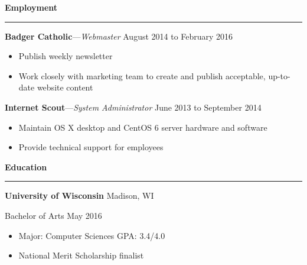\documentclass[12pt,letterpaper]{article}
\newenvironment{details}{
    \vspace{-.8em}
    \begin{itemize}
        \renewcommand \labelitemi{\labelitemiv}
        \setlength{\itemsep}{0pt}
        \setlength{\parskip}{-1pt}
        \setlength{\parsep}{0pt}
    }{
    \end{itemize}
    \vspace{-.5em}
}
\newcommand{\hr} {
    \vspace{-1em}
    \par\rule{\textwidth}{1pt}
    \vspace{-1.5em}
}
\newcommand{\ressection}[1] {
    \par{\large \textbf{#1}}
    \hr
}
\newenvironment{employment} {
    \setlength{\parskip}{0pt}
    \ressection{Employment}
}{
    \vspace{0.5em}
}
\newenvironment{education} {
    \ressection{Education}
}{
    \vspace{0.5em}
}
\newcommand{\employer}[3] {
    \vspace{3pt}
    {\par\textbf{#1}---\textit{#2} \hfill #3}
    \par
}
\newcommand{\educator}[4] {
    \textbf{#1}
    \hfill #2
    \par #3 \hfill #4
    \par%
}
\begin{document}
\begin{employment}
\employer{Badger Catholic}{Webmaster}{August 2014 to February 2016}
\begin{details}
    \item Publish weekly newsletter
    \item Work closely with marketing team to create and publish acceptable, up-to-date website content
\end{details}

\employer{Internet Scout}{System Administrator}{June 2013 to September 2014}
\begin{details}
    \item Maintain OS X desktop and CentOS 6 server hardware and software
    \item Provide technical support for employees
\end{details}

\end{employment}

\begin{education}

\educator{University of Wisconsin}{Madison, WI}{Bachelor of Arts}{May 2016}
\begin{details}
    \item Major: Computer Sciences \hfill GPA: 3.4/4.0
    \item National Merit Scholarship finalist
\end{details}

\end{education}
\end{document}
